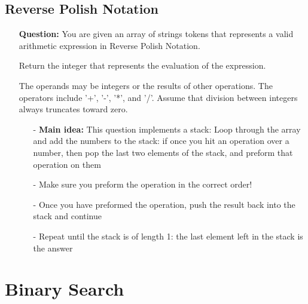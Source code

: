 \documentclass[12pt]{article}
\begin{document}
\subsection{Reverse Polish Notation}
\begin{enumerate}
  \item[] \textbf{Question:} You are given an array of strings tokens that represents a valid arithmetic expression in Reverse Polish Notation.

Return the integer that represents the evaluation of the expression.

The operands may be integers or the results of other operations.
The operators include '+', '-', '*', and '/'.
Assume that division between integers always truncates toward zero.

    \begin{enumerate}
      \item[-] \textbf{Main idea:} This question implements a stack: Loop through the array and add the numbers to the stack: if once you hit an operation over a number, then pop the last two elements of the stack, and preform that operation on them
      \item[-] Make sure you preform the operation in the correct order!
      \item[-] Once you have preformed the operation, push the result back into the stack and continue 
      \item[-] Repeat until the stack is of length 1: the last element left in the stack is the answer
    \end{enumerate}
\end{enumerate}



\section{Binary Search}
\end{document}
